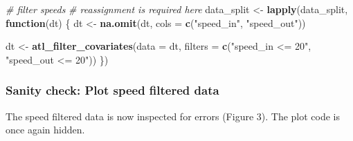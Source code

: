 \documentclass[]{scrartcl}
\newenvironment{Shaded}{}{}
\newcommand{\CommentTok}[1]{\textcolor[rgb]{0.38,0.63,0.69}{\textit{#1}}}
\newcommand{\ControlFlowTok}[1]{\textcolor[rgb]{0.00,0.44,0.13}{\textbf{#1}}}
\newcommand{\DataTypeTok}[1]{\textcolor[rgb]{0.56,0.13,0.00}{#1}}
\newcommand{\KeywordTok}[1]{\textcolor[rgb]{0.00,0.44,0.13}{\textbf{#1}}}
\newcommand{\NormalTok}[1]{#1}
\newcommand{\StringTok}[1]{\textcolor[rgb]{0.25,0.44,0.63}{#1}}
\begin{document}
\begin{Shaded}
\begin{Highlighting}[]
\CommentTok{# filter speeds}
\CommentTok{# reassignment is required here}
\NormalTok{data_split <-}\StringTok{ }\KeywordTok{lapply}\NormalTok{(data_split, }\ControlFlowTok{function}\NormalTok{(dt) \{}
\NormalTok{  dt <-}\StringTok{ }\KeywordTok{na.omit}\NormalTok{(dt, }\DataTypeTok{cols =} \KeywordTok{c}\NormalTok{(}\StringTok{"speed_in"}\NormalTok{, }\StringTok{"speed_out"}\NormalTok{))}
  
\NormalTok{  dt <-}\StringTok{ }\KeywordTok{atl_filter_covariates}\NormalTok{(}\DataTypeTok{data =}\NormalTok{ dt,}
                              \DataTypeTok{filters =} \KeywordTok{c}\NormalTok{(}\StringTok{"speed_in <= 20"}\NormalTok{,}
                                          \StringTok{"speed_out <= 20"}\NormalTok{))}
\NormalTok{\})}
\end{Highlighting}
\end{Shaded}

\hypertarget{sanity-check-plot-speed-filtered-data}{%
\subsubsection{Sanity check: Plot speed filtered data}\label{sanity-check-plot-speed-filtered-data}}

The speed filtered data is now inspected for errors (Figure 3). The plot code is once again hidden.
\end{document}
